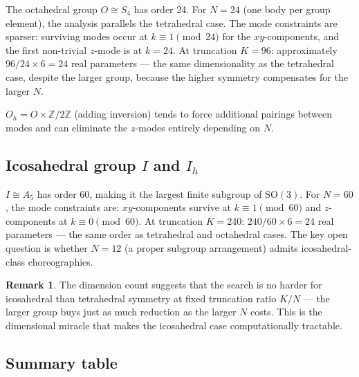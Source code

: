 \documentclass[12pt, a4paper]{article}
\theoremstyle{plain}
\theoremstyle{definition}
\newtheorem{remark}[theorem]{Remark}
\newcommand{\Z}{\mathbb{Z}}
\newcommand{\SO}{\mathrm{SO}}
\begin{document}
The octahedral group $O \cong S_4$ has order 24.  For $N=24$
(one body per group element), the analysis parallels the tetrahedral
case.  The mode constraints are sparser: surviving modes occur at
$k \equiv 1 \pmod{24}$ for the $xy$-components, and the first
non-trivial $z$-mode is at $k = 24$.  At truncation $K=96$:
approximately $96/24 \times 6 = 24$ real parameters — the same
dimensionality as the tetrahedral case, despite the larger group,
because the higher symmetry compensates for the larger $N$.

$O_h = O \times \Z/2\Z$ (adding inversion) tends to force additional
pairings between modes and can eliminate the $z$-modes entirely
depending on $N$.

\subsection{Icosahedral group $I$ and $I_h$}

$I \cong A_5$ has order 60, making it the largest finite subgroup of
$\SO(3)$.  For $N = 60$, the mode constraints are:
$xy$-components survive at $k \equiv 1 \pmod{60}$ and $z$-components
at $k \equiv 0 \pmod{60}$.  At truncation $K = 240$: $240/60 \times
6 = 24$ real parameters — the same order as tetrahedral and
octahedral cases.  The key open question is whether $N=12$ (a proper
subgroup arrangement) admits icosahedral-class choreographies.

\begin{remark}
The dimension count suggests that the search is no harder for
icosahedral than tetrahedral symmetry at fixed truncation ratio $K/N$
— the larger group buys just as much reduction as the larger $N$
costs.  This is the dimensional miracle that makes the icosahedral
case computationally tractable.
\end{remark}

\subsection{Summary table}
\end{document}
